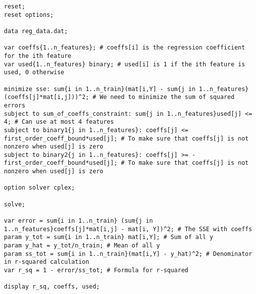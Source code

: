 \documentclass[15pt,a4paper,openright]{article}
\begin{document}
\begin{lstlisting}[language=AMPL, caption=1d Code]
reset;
reset options;

data reg_data.dat;

var coeffs{1..n_features}; # coeffs[i] is the regression coefficient for the ith feature
var used{1..n_features} binary; # used[i] is 1 if the ith feature is used, 0 otherwise

minimize sse: sum{i in 1..n_train}(mat[i,Y] - sum{j in 1..n_features}(coeffs[j]*mat[i,j]))^2; # We need to minimize the sum of squared errors
subject to sum_of_coeffs_constraint: sum{j in 1..n_features}used[j] <= 4; # Can use at most 4 features
subject to binary1{j in 1..n_features}: coeffs[j] <= first_order_coeff_bound*used[j]; # To make sure that coeffs[j] is not nonzero when used[j] is zero
subject to binary2{j in 1..n_features}: coeffs[j] >= -first_order_coeff_bound*used[j]; # To make sure that coeffs[j] is not nonzero when used[j] is zero

option solver cplex;

solve;

var error = sum{i in 1..n_train} (sum{j in 1..n_features}coeffs[j]*mat[i,j] - mat[i, Y])^2; # The SSE with coeffs
param y_tot = sum{i in 1..n_train} mat[i,Y]; # Sum of all y
param y_hat = y_tot/n_train; # Mean of all y
param ss_tot = sum{i in 1..n_train}(mat[i,Y] - y_hat)^2; # Denominator in r-squared calculation
var r_sq = 1 - error/ss_tot; # Formula for r-squared

display r_sq, coeffs, used;

\end{lstlisting}
\end{document}
